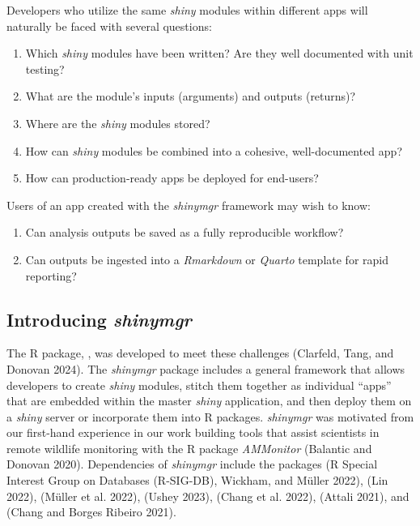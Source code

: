 \newpage

Developers who utilize the same \emph{shiny} modules within different apps will naturally be faced with several questions:

\begin{enumerate}
\def\labelenumi{\arabic{enumi}.}
\tightlist
\item
  Which \emph{shiny} modules have been written? Are they well documented with unit testing?
\item
  What are the module's inputs (arguments) and outputs (returns)?
\item
  Where are the \emph{shiny} modules stored?
\item
  How can \emph{shiny} modules be combined into a cohesive, well-documented app?
\item
  How can production-ready apps be deployed for end-users?
\end{enumerate}

Users of an app created with the \emph{shinymgr} framework may wish to know:

\begin{enumerate}
\def\labelenumi{\arabic{enumi}.}
\setcounter{enumi}{5}
\tightlist
\item
  Can analysis outputs be saved as a fully reproducible workflow?
\item
  Can outputs be ingested into a \emph{Rmarkdown} or \emph{Quarto} template for rapid reporting?
\end{enumerate}

\subsection{\texorpdfstring{Introducing \emph{shinymgr}}{Introducing shinymgr}}\label{introducing-shinymgr}

The R package, , was developed to meet these challenges (Clarfeld, Tang, and Donovan 2024). The \emph{shinymgr} package includes a general framework that allows developers to create \emph{shiny} modules, stitch them together as individual ``apps'' that are embedded within the master \emph{shiny} application, and then deploy them on a \emph{shiny} server or incorporate them into R packages. \emph{shinymgr} was motivated from our first-hand experience in our work building tools that assist scientists in remote wildlife monitoring with the R package \emph{AMMonitor} (Balantic and Donovan 2020). Dependencies of \emph{shinymgr} include the packages  (R Special Interest Group on Databases (R-SIG-DB), Wickham, and Müller 2022),  (Lin 2022),  (Müller et al. 2022),  (Ushey 2023),  (Chang et al. 2022),  (Attali 2021), and  (Chang and Borges Ribeiro 2021).

